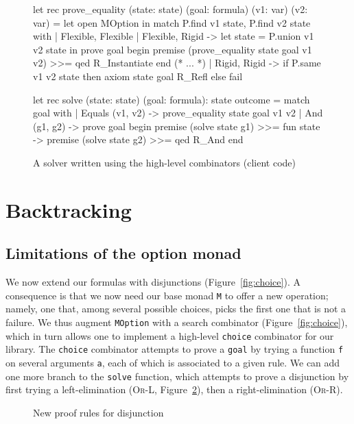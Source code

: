 \documentclass{easychair}
\def\li{\lstinline}
\let\Rule\textsc
\newcommand{\fref}[1]{Figure~\ref{fig:#1}}
\begin{document}
\begin{figure}
  \centering
\begin{ocaml}
let rec prove_equality (state: state) (goal: formula) (v1: var) (v2: var) =
  let open MOption in
  match P.find v1 state, P.find v2 state with
  | Flexible, Flexible
  | Flexible, Rigid ->
      let state = P.union v1 v2 state in
      prove goal begin
        premise (prove_equality state goal v1 v2) >>=
        qed R_Instantiate
      end
  (* ... *)
  | Rigid, Rigid ->
      if P.same v1 v2 state then
        axiom state goal R_Refl
      else
        fail

let rec solve (state: state) (goal: formula): state outcome =
  match goal with
  | Equals (v1, v2) ->
      prove_equality state goal v1 v2
  | And (g1, g2) ->
      prove goal begin
        premise (solve state g1) >>= fun state ->
        premise (solve state g2) >>=
        qed R_And
      end
\end{ocaml}
  \caption{A solver written using the high-level combinators (client code)}
  \label{fig:solver2}
\end{figure}

\section{Backtracking}

\subsection{Limitations of the option monad}

We now extend our formulas with disjunctions (\fref{choice}). A consequence
is that we now need our base monad \li+M+ to offer a new operation; namely, one
that, among several possible choices, picks the first one that is not a failure.
We thus augment \li+MOption+ with a search combinator (\fref{choice}), which in
turn allows one to implement a high-level \li+choice+ combinator for our
library. The \li+choice+ combinator attempts to prove a \li+goal+ by trying a
function \li+f+ on several arguments \li+a+, each of which
is associated to a given rule. We can add one more branch to the \li+solve+
function, which attempts to prove a disjunction by first trying a
left-elimination (\Rule{Or-L}, \fref{proof-system2}), then a right-elimination
(\Rule{Or-R}).

\begin{figure}
  \centering
  \begin{mathpar}

  \end{mathpar}
  \caption{New proof rules for disjunction}
  \label{fig:proof-system2}
\end{figure}
\end{document}
